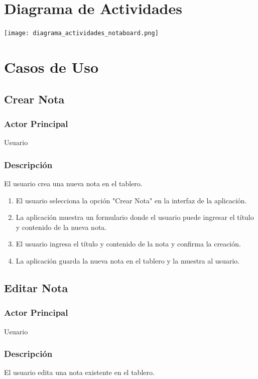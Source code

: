 \section{Diagrama de Actividades}
\begin{center}
\texttt{[image: diagrama\_actividades\_notaboard.png]}
\end{center}

\section{Casos de Uso}
\subsection{Crear Nota}
\subsubsection{Actor Principal}
Usuario

\subsubsection{Descripción}
El usuario crea una nueva nota en el tablero.

\begin{enumerate}
  \item El usuario selecciona la opción "Crear Nota" en la interfaz de la aplicación.
  \item La aplicación muestra un formulario donde el usuario puede ingresar el título y contenido de la nueva nota.
  \item El usuario ingresa el título y contenido de la nota y confirma la creación.
  \item La aplicación guarda la nueva nota en el tablero y la muestra al usuario.
\end{enumerate}

\subsection{Editar Nota}
\subsubsection{Actor Principal}
Usuario

\subsubsection{Descripción}
El usuario edita una nota existente en el tablero.

